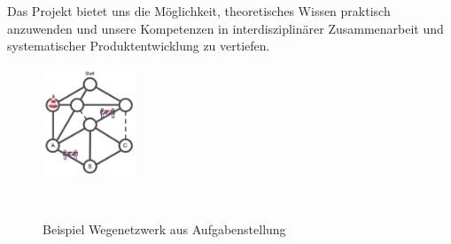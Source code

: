 \documentclass[main.tex]{subfiles} %
\begin{document}
Das Projekt bietet uns die Möglichkeit, theoretisches Wissen praktisch 
anzuwenden und unsere Kompetenzen in interdisziplinärer Zusammenarbeit 
und systematischer Produktentwicklung zu vertiefen.

\begin{figure}[H]
    \centering
    \includegraphics[width=0.25\textwidth]{Wegenetzwerk_Aufgabenstellung.pdf}
    \caption{Beispiel Wegenetzwerk aus Aufgabenstellung}~\label{fig:Wegenetzwerk_Aufgabenstellung}
\end{figure}
\end{document}
